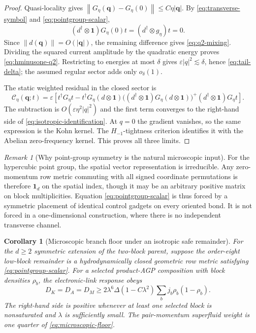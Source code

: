 \documentclass[11pt]{article}
\newtheorem{corollary}[theorem]{Corollary}
\theoremstyle{definition}
\theoremstyle{remark}
\newtheorem{remark}[theorem]{Remark}
\newcommand{\cC}{\mathcal C}
\newcommand{\Id}{\mathbf 1}
\newcommand{\norm}[1]{\left\lVert #1\right\rVert}
\newcommand{\abs}[1]{\left\lvert #1\right\rvert}
\newcommand{\eps}{\varepsilon}
\newcommand{\bq}{\bm q}
\begin{document}
\begin{proof}
Quasi-locality gives
$\norm{G_\eta(\bq)-G_\eta(0)}\le C\eta\abs{\bq}$.  By
\eqref{eq:transverse-symbol} and \eqref{eq:pointgroup-scalar},
\begin{equation}
 (d^\dagger\otimes\Id)G_\eta(0)t
 =(d^\dagger\otimes g_\eta)t=0.
\end{equation}
Since $\norm{d(\bq)}=O(\abs\bq)$, the remaining difference gives
\eqref{eq:q2-mixing}.  Dividing the squared current amplitude by the
quadratic energy proves \eqref{eq:hminusone-q2}.  Restricting to energies at
most $\delta$ gives $\eps\abs q^2\lesssim\delta$, hence
\eqref{eq:tail-delta}; the assumed regular sector adds only $o_\delta(1)$.

The static weighted residual in the closed sector is
\begin{equation}
 \cC_\eta(\bq;t)
 =\eps\left[
 t^\dagger G_\eta t
 -t^\dagger G_\eta(d\otimes\Id)
 \bigl((d^\dagger\otimes\Id)G_\eta(d\otimes\Id)\bigr)^+
 (d^\dagger\otimes\Id)G_\eta t
 \right].
 \label{eq:symbol-residual}
\end{equation}
The subtraction is $O(\eps\eta^2\abs q^2)$ and the first term converges to
the right-hand side of \eqref{eq:isotropic-identification}.  At $q=0$ the
gradient vanishes, so the same expression is the Kohn kernel.  The
$H_{-1}$-tightness criterion identifies it with the Abelian zero-frequency
kernel.  This proves all three limits.
\end{proof}

\begin{remark}[Why point-group symmetry is the natural microscopic input]
For the hypercubic point group, the spatial vector representation is
irreducible.  Any zero-momentum row metric commuting with all signed coordinate
permutations is therefore $\Id_d$ on the spatial index, though it may be an
arbitrary positive matrix on block multiplicities.  Equation
\eqref{eq:pointgroup-scalar} is thus forced by a symmetric placement of
identical control gadgets on every oriented bond.  It is not forced in a
one-dimensional construction, where there is no independent transverse
channel.
\end{remark}

\begin{corollary}[Microscopic branch floor under an isotropic safe remainder]
\label{cor:micro-floor}
For the $d\ge2$ symmetric extension of the two-block parent, suppose the
order-eight low-block remainder is a hydrodynamically closed geometric row
metric satisfying \eqref{eq:pointgroup-scalar}.  For a selected product-AGP
composition with block densities $\rho_b$, the electronic-link response obeys
\begin{equation}
 D_K=D_A=D_M
 \ge2\lambda^6\Delta
 \left(1-C\lambda^2\right)
 \sum_bj_b\rho_b(1-\rho_b).
 \label{eq:microscopic-floor}
\end{equation}
The right-hand side is positive whenever at least one selected block is
nonsaturated and $\lambda$ is sufficiently small.  The pair-momentum
superfluid weight is one quarter of \eqref{eq:microscopic-floor}.
\end{corollary}
\end{document}

